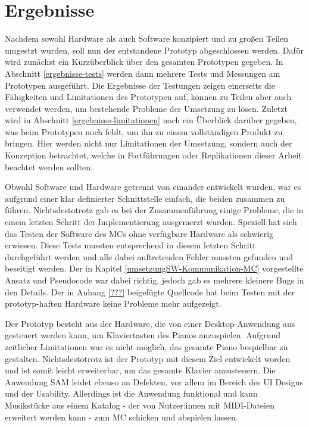 

\chapter{Ergebnisse} \label{ergebnisse}
\nocite{*}

Nachdem sowohl Hardware als auch Software konzipiert und zu großen Teilen umgestzt wurden, soll nun der entstandene Prototyp abgeschlossen werden.
Dafür wird zunächst ein Kurzüberblick über den gesamten Prototypen gegeben.
In Abschnitt \ref{ergebnisse-tests} werden dann mehrere Tests und Messungen am Prototypen ausgeführt.
Die Ergebnisse der Testungen zeigen einerseits die Fähigkeiten und Limitationen des Prototypen auf, können zu Teilen aber auch verwendet werden, um bestehende Probleme der Umsetzung zu lösen.
Zuletzt wird in Abschnitt \ref{ergebnisse-limitationen} noch ein Überblick darüber gegeben, was beim Prototypen noch fehlt, um ihn zu einem vollständigen Produkt zu bringen. %
Hier werden nicht nur Limitationen der Umsetzung, sondern auch der Konzeption betrachtet, welche in Fortführungen oder Replikationen dieser Arbeit beachtet werden sollten.


Obwohl Software und Hardware getrennt von einander entwickelt wurden, war es aufgrund einer klar definierter Schnittstelle einfach, die beiden zusammen zu führen.
Nichtsdestotrotz gab es bei der Zusammenführung einige Probleme, die in einem letzten Schritt der Implementierung ausgemerzt wurden.
Speziell hat sich das Testen der Software des \ac{MC}s ohne verfügbare Hardware als schwierig erwiesen.
Diese Tests mussten entsprechend in diesem letzten Schritt durchgeführt werden und alle dabei auftretenden Fehler mussten gefunden und beseitigt werden.
Der in Kapitel \ref{umsetzungSW-Kommunikation-MC} vorgestellte Ansatz und Pseudocode war dabei richtig, jedoch gab es mehrere kleinere Bugs in den Details.
Der in Anhang \ref{???} beigefügte Quellcode hat beim Testen mit der prototyp-haften Hardware keine Probleme mehr aufgezeigt.

Der Prototyp besteht aus der Hardware, die von einer Desktop-Anwendung aus gesteuert werden kann, um Klaviertasten des Pianos anzuspielen.
Aufgrund zeitlicher Limitationen war es nicht möglich, das gesamte Piano bespielbar zu gestalten.
Nichtsdestotrotz ist der Prototyp mit diesem Ziel entwickelt worden und ist somit leicht erweiterbar, um das gesamte Klavier anzusteuern.
Die Anwendung \ac{SAM} leidet ebenso an Defekten, vor allem im Bereich des \ac{UI} Designs und der Usability.
Allerdings ist die Anwendung funktional und kann Musikstücke aus einem Katalog - der von Nutzer:innen mit \ac{MIDI}-Dateien erweitert werden kann - zum \ac{MC} schicken und abspielen lassen.


